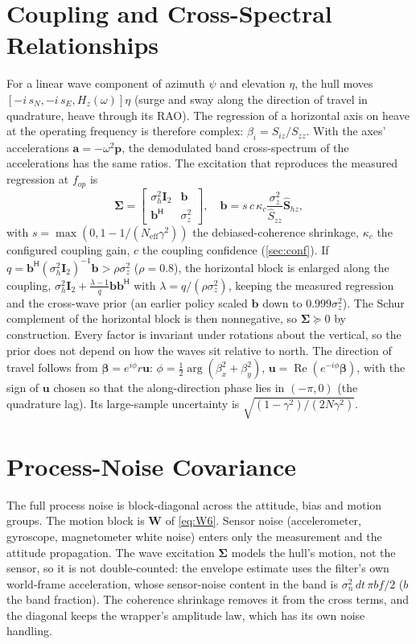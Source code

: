 \documentclass[conference]{IEEEtran}
\DeclareRobustCommand{\vct}[1]{\bm{#1}}
\DeclareRobustCommand{\mat}[1]{\bm{#1}}
\newcommand{\Hr}{^{\mathsf H}}
\theoremstyle{bodysmall}
\begin{document}
\section{Coupling and Cross-Spectral Relationships}
For a linear wave component of azimuth $\psi$ and elevation $\eta$, the hull
moves $[-i\,s_N,-i\,s_E,H_z(\omega)]\eta$ (surge and sway along the
direction of travel in quadrature, heave through its RAO). The regression of
a horizontal axis on heave at the operating frequency is therefore complex:
$\beta_i=S_{iz}/S_{zz}$. With the axes' accelerations
$\vct a=-\omega^2\vct p$, the demodulated band cross-spectrum of the
accelerations has the same ratios. The excitation that reproduces the
measured regression at $f_{op}$ is
\begin{equation}
\mat\Sigma=\begin{bmatrix}\sigma_h^2\mat I_2&\vct b\\\vct b\Hr&\sigma_z^2\end{bmatrix},\quad
\vct b=s\,c\,\kappa_c\frac{\sigma_z^2}{\hat S_{zz}}\hat{\vct S}_{hz},
\label{eq:map}
\end{equation}
with $s=\max(0,1-1/(N_{\mathrm{eff}}\gamma^2))$ the debiased-coherence
shrinkage, $\kappa_c$ the configured coupling gain, $c$ the coupling
confidence (\cref{sec:conf}). If
$q=\vct b\Hr(\sigma_h^2\mat I_2)^{-1}\vct b>\rho\sigma_z^2$ ($\rho=0.8$), the
horizontal block is enlarged along the coupling,
$\sigma_h^2\mat I_2+\frac{\lambda-1}{q}\vct b\vct b\Hr$ with
$\lambda=q/(\rho\sigma_z^2)$, keeping the measured regression and the
cross-wave prior (an earlier policy scaled $\vct b$ down to $0.999\sigma_z^2$). The
Schur complement of the horizontal block is then nonnegative, so
$\mat\Sigma\succeq0$ by construction. Every factor is invariant under rotations about the
vertical, so the prior does not depend on how the waves sit relative to
north. The direction of travel follows from $\vct\beta=e^{i\phi}r\vct u$:
$\phi=\tfrac12\arg(\beta_x^2+\beta_y^2)$, $\vct u=\operatorname{Re}(e^{-i\phi}\vct\beta)$,
with the sign of $\vct u$ chosen so that the along-direction phase lies in
$(-\pi,0)$ (the quadrature lag). Its large-sample uncertainty is
$\sqrt{(1-\gamma^2)/(2N\gamma^2)}$.

\section{Process-Noise Covariance}
The full process noise is block-diagonal across the attitude, bias and
motion groups. The motion block is $\mat W$ of \eqref{eq:W6}. Sensor noise
(accelerometer, gyroscope, magnetometer white noise) enters only the
measurement and the attitude propagation. The wave excitation $\mat\Sigma$
models the hull's motion, not the sensor, so it is not double-counted: the
envelope estimate uses the filter's own world-frame acceleration, whose
sensor-noise content in the band is $\sigma_n^2\,dt\,\pi bf/2$ ($b$ the band
fraction). The coherence shrinkage removes it from the cross terms, and the
diagonal keeps the wrapper's amplitude law, which has its own noise
handling.
\end{document}
